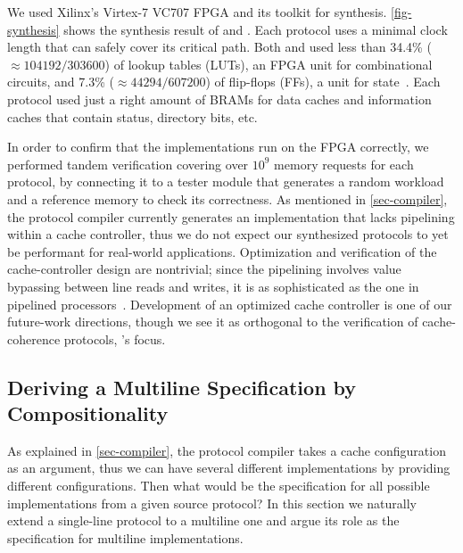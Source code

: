 \documentclass[sigplan,10pt,review,anonymous,screen]{acmart}\settopmatter{printfolios=true,printccs=false,printacmref=false}
\begin{document}
We used Xilinx's Virtex-7 VC707 FPGA and its toolkit for synthesis.
\autoref{fig-synthesis} shows the synthesis result of \bhemh{} and \bhemt{}.
Each protocol uses a minimal clock length that can safely cover its critical path.
Both \bhemh{} and \bhemt{} used less than 34.4\% ($\approx 104192/303600$) of lookup tables (LUTs), an FPGA unit for combinational circuits, and 7.3\% ($\approx 44294/607200$) of flip-flops (FFs), a unit for state~\cite{vc707}.
Each protocol used just a right amount of BRAMs for data caches and information caches that contain status, directory bits, etc.

In order to confirm that the implementations run on the FPGA correctly, we performed tandem verification covering over $10^9$ memory requests for each protocol, by connecting it to a tester module that generates a random workload and a reference memory to check its correctness.
As mentioned in \autoref{sec-compiler}, the protocol compiler currently generates an implementation that lacks pipelining within a cache controller, thus we do not expect our synthesized protocols to yet be performant for real-world applications.
Optimization and verification of the cache-controller design are nontrivial; since the pipelining involves value bypassing between line reads and writes, it is as sophisticated as the one in pipelined processors~\cite{comarch}.
Development of an optimized cache controller is one of our future-work directions, though we see it as orthogonal to the verification of cache-coherence protocols, \hemiola{}'s focus.

\subsection{Deriving a Multiline Specification by Compositionality}
\label{sec-multiline}

As explained in \autoref{sec-compiler}, the protocol compiler takes a cache configuration as an argument, thus we can have several different implementations by providing different configurations.
Then what would be the specification for all possible implementations from a given source protocol?
In this section we naturally extend a single-line \hemiola{} protocol to a multiline one and argue its role as the specification for multiline implementations.
\end{document}
